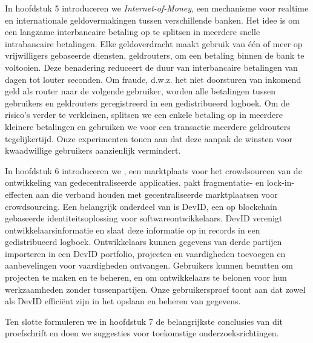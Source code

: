 {In hoofdstuk 5 introduceren we \emph{Internet-of-Money}, een mechanisme voor realtime en internationale geldovermakingen tussen verschillende banken.
Het idee is om een ​​langzame interbancaire betaling op te splitsen in meerdere snelle intrabancaire betalingen.
Elke geldoverdracht maakt gebruik van één of meer op vrijwilligers gebaseerde diensten, geldrouters, om een ​​betaling binnen de bank te voltooien.
Deze benadering reduceert de duur van interbancaire betalingen van dagen tot louter seconden.
Om fraude, d.w.z. het niet doorsturen van inkomend geld als router naar de volgende gebruiker, worden alle betalingen tussen gebruikers en geldrouters geregistreerd in een gedistribueerd logboek.
Om de risico's verder te verkleinen, splitsen we een enkele betaling op in meerdere kleinere betalingen en gebruiken we voor een transactie meerdere geldrouters tegelijkertijd.
Onze experimenten tonen aan dat deze aanpak de winsten voor kwaadwillige gebruikers aanzienlijk vermindert.

In hoofdstuk 6 introduceren we \emph{\Dappcoder{}}, een marktplaats voor het crowdsourcen van de ontwikkeling van gedecentraliseerde applicaties.
\Dappcoder{} pakt fragmentatie- en lock-in-effecten aan die verband houden met gecentraliseerde marktplaatsen voor crowdsourcing.
Een belangrijk onderdeel van \Dappcoder{} is DevID, een op blockchain gebaseerde identiteitsoplossing voor softwareontwikkelaars.
DevID verenigt ontwikkelaarsinformatie en slaat deze informatie op in records in een gedistribueerd logboek.
Ontwikkelaars kunnen gegevens van derde partijen importeren in een DevID portfolio, projecten en vaardigheden toevoegen en aanbevelingen voor vaardigheden ontvangen.
Gebruikers kunnen \Dappcoder{} benutten om projecten te maken en te beheren, en om ontwikkelaars te belonen voor hun werkzaamheden zonder tussenpartijen.
Onze gebruikersproef toont aan dat zowel \Dappcoder{} als DevID efficiënt zijn in het opslaan en beheren van gegevens.

Ten slotte formuleren we in hoofdstuk 7 de belangrijkste conclusies van dit proefschrift en doen we suggesties voor toekomstige onderzoeksrichtingen.
}



